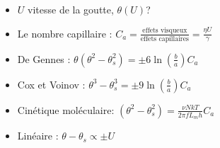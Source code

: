 \documentclass[french]{article}
\begin{document}
\begin{itemize}
\item $U$ vitesse de la goutte, $\theta(U)$?
\item Le nombre capillaire : $C_{a} = \frac{\text{effets visqueux}}{\text{effets capillaires}} = \frac{\eta U}{\gamma}$
\item De Gennes : $ \theta \left(\theta^{2} - \theta_{s}^{2}\right) = \pm 6\ln\left(\frac{b}{a}\right)C_{a}$
\item Cox et Voinov : $\theta^{3} - \theta_{s}^{3} = \pm 9\ln\left(\frac{b}{a}\right) C_{a}$
\item Cinétique moléculaire: $\left(\theta^{2} - \theta_{s}^{2}\right) = \frac{\nu NkT}{2\pi fL_{m}h}C_{a}$
\item Linéaire : $\theta - \theta_{s} \propto \pm U$
\end{itemize}
\end{document}
